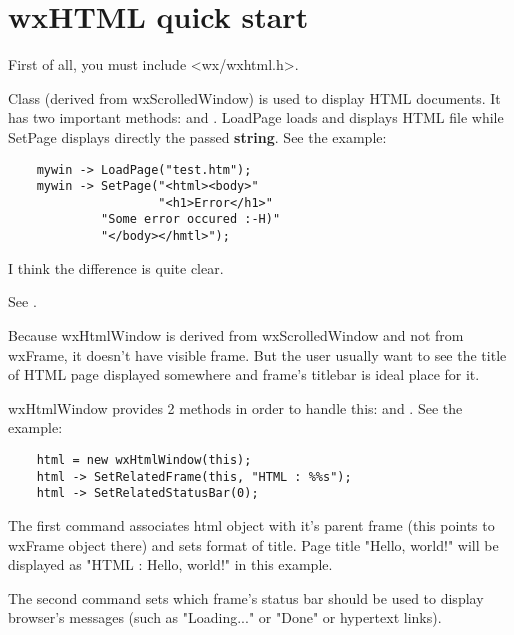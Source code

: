 \section{wxHTML quick start}\label{wxhtmlquickstart}


First of all, you must include <wx/wxhtml.h>.

Class  (derived from wxScrolledWindow)
is used to display HTML documents.
It has two important methods:  
and .
LoadPage loads and displays HTML file while SetPage displays directly the
passed {\bf string}. See the example:

\begin{verbatim}
    mywin -> LoadPage("test.htm");
    mywin -> SetPage("<html><body>"
                     "<h1>Error</h1>"
		     "Some error occured :-H)"
		     "</body></hmtl>");
\end{verbatim}

I think the difference is quite clear.


See .


Because wxHtmlWindow is derived from wxScrolledWindow and not from
wxFrame, it doesn't have visible frame. But the user usually want to see
the title of HTML page displayed somewhere and frame's titlebar is 
ideal place for it.

wxHtmlWindow provides 2 methods in order to handle this: 
 and 
. 
See the example:

\begin{verbatim}
    html = new wxHtmlWindow(this);
    html -> SetRelatedFrame(this, "HTML : %%s");
    html -> SetRelatedStatusBar(0);
\end{verbatim}

The first command associates html object with it's parent frame
(this points to wxFrame object there) and sets format of title.
Page title "Hello, world!" will be displayed as "HTML : Hello, world!"
in this example.

The second command sets which frame's status bar should be used to display
browser's messages (such as "Loading..." or "Done" or hypertext links).

